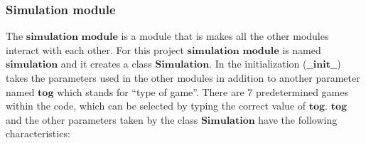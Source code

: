 \documentclass{article}
\begin{document}
\subsubsection{Simulation module}
The $\textbf{simulation module}$ is a module that is makes all the other modules interact with each other. For this project $\textbf{simulation module}$ is named $\textbf{simulation}$  and it creates a class $\textbf{Simulation}$. In the initialization ($\textbf{\_\_init\_\_}$) takes the parameters used in the other modules in addition to another parameter named $\textbf{tog}$ which stands for ``type of game''. There are 7 predetermined games within the code, which can be selected by typing the correct value of $\textbf{tog}$. $\textbf{tog}$ and the other parameters taken by the class $\textbf{Simulation}$ have the following characteristics:
\end{document}
